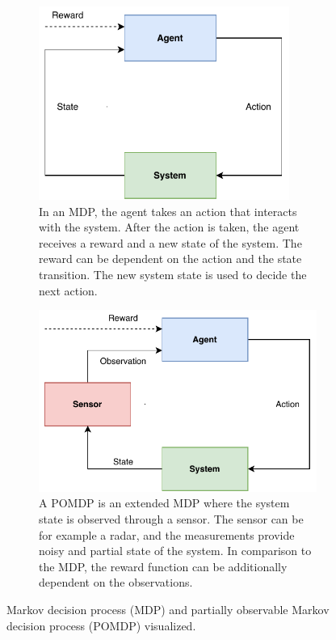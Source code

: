 \documentclass[english, 12pt, a4paper, elec, utf8, a-1b, online]{aaltothesis}
\begin{document}
\begin{figure}
    \centering
    \begin{subfigure}[b]{0.45\textwidth}
        \centering
        \includegraphics[width=0.9\textwidth]{figures/MDP.pdf}
        \caption{
        In an MDP, the agent takes an action that interacts with the system.
        After the action is taken, the agent receives a reward and a new state of the system.
        The reward can be dependent on the action and the state transition.
        The new system state is used to decide the next action.}
        \label{fig:mdp}
    \end{subfigure}
    \hfill
    \begin{subfigure}[b]{0.45\textwidth}
        \centering
        \includegraphics[width=\textwidth]{figures/POMDP.pdf}
        \caption{
        A POMDP is an extended MDP where the system state is observed through a sensor.
        The sensor can be for example a radar, and the measurements provide noisy and partial state of the system. 
        In comparison to the MDP, the reward function can be additionally dependent on the observations.
        }
        \label{fig:pomdp}
    \end{subfigure}
    \caption{Markov decision process (MDP) and partially observable Markov decision process (POMDP) visualized. }
    \label{fig:my_label}
\end{figure}
\end{document}
